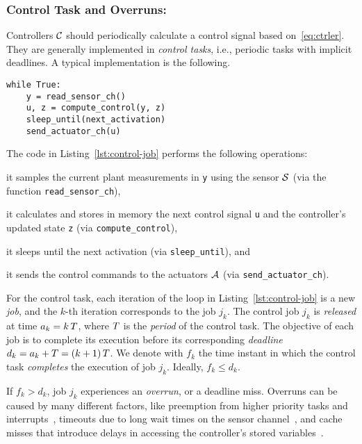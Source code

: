 \subsubsection*{Control Task and Overruns:}
Controllers $\mathcal{C}$ should periodically calculate a control signal based on~\eqref{eq:ctrler}. They are generally implemented in \emph{control tasks}, i.e., periodic tasks with implicit deadlines.
A typical implementation is the following.
\begin{lstlisting}[label=lst:control-job,caption={Typical control algorithm execution.}]
while True:
    y = read_sensor_ch()
    u, z = compute_control(y, z)
    sleep_until(next_activation)
    send_actuator_ch(u)
\end{lstlisting}
The code in Listing~\ref{lst:control-job} performs the following operations:
\begin{enumerate*}[label=(\roman*)]
    \item it samples the current plant measurements in \texttt{y} using the sensor $\mathcal{S}$ (via the function \texttt{read\_sensor\_ch}),
    \item it calculates and stores in memory the next control signal \texttt{u} and the controller's updated state \texttt{z} (via \texttt{compute\_control}),
    \item it sleeps until the next activation (via \texttt{sleep\_until}), and
    \item it sends the control commands to the actuators $\mathcal{A}$ (via \texttt{send\_actuator\_ch}).
\end{enumerate*}

For the control task, each iteration of the loop in Listing~\ref{lst:control-job} is a new \emph{job}, and the $k$-th iteration corresponds to the job $j_k$.
The control job $j_k$ is \emph{released} at time $a_k = k\,T$, where $T$ is the \emph{period} of the control task.
The objective of each job is to complete its execution before its corresponding \emph{deadline} $d_k = a_k + T = (k+1)\,T$.
We denote with $f_k$ the time instant in which the control task \emph{completes} the execution of job $j_k$.
Ideally, $f_k \leq d_k$.

If $f_k > d_k$, job $j_k$ experiences an \emph{overrun}, or a deadline miss.
Overruns can be caused by many different factors, like preemption from higher priority tasks and interrupts~\cite{Stankovic:1995}, timeouts due to long wait times on the sensor channel~\cite{Ohlin:2006}, and cache misses that introduce delays in accessing the controller's stored variables~\cite{Wang:2012}.

